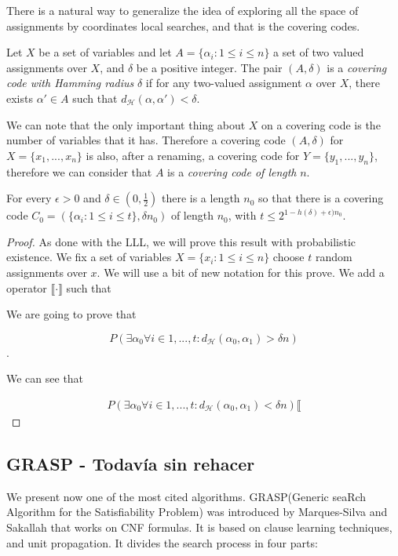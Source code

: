 There is a natural way to generalize the idea of exploring all the space of assignments by coordinates local searches, and that is the covering codes.

\begin{definition}
  Let $X$ be a set of variables and let $A = \{\alpha_i: 1 \le i \le n\}$ a set of two valued assignments over $X$, and $\delta$ be a positive integer. The pair $(A,\delta)$ is a \emph{covering code with Hamming radius} $\delta$ if for any  two-valued assignment  $\alpha$  over $X$, there exists $\alpha'\in A$ such that $d_\mathcal{H} (\alpha, \alpha') < \delta$.
\end{definition}

We can note that the only important thing about $X$ on a covering code is the number of variables that it has. Therefore a covering code $(A,\delta)$ for $X=\{x_1,...,x_n\}$ is also, after a renaming, a covering code for $Y=\{y_1,...,y_n\}$, therefore we can consider that $A$ is a \emph{covering code of length} $n$. 


\begin{lemma}
For every $\epsilon > 0$ and $\delta \in (0, \frac{1}{2})$ there is a length $n_0$ so that there is a covering code $C_0 = (\{\alpha_i : 1\le i\le t\}, \delta n_0)$ of length $n_0$, with $t\le 2^{1-h(\delta)+\epsilon)n_0}$.
\end{lemma}

\begin{proof}
  As done with the LLL, we will prove this result with probabilistic existence. We fix a set of variables $X=\{ x_i : 1 \le i \le n\}$ choose $t$ random assignments over $x$. We will use a bit of new notation for this prove. We add a operator $\llbracket \cdot \rrbracket$ such that

  We are going to prove that

  $$P(\exists \alpha_0 \forall i\in 1,...,t : d_\mathcal{H} (\alpha_0,\alpha_1)  > \delta n)$$.

  We can see that 

\begin{equation}
\begin{split}
  P(\exists \alpha_0 \forall i\in 1,...,t : d_\mathcal{H} (\alpha_0,\alpha_1)  < \delta n)   \llbracket
\end{split}
\end{equation}



\end{proof}

\subsection{GRASP - Todavía sin rehacer }
\label{sub:grasp}
We present now one of the most cited algorithms.  GRASP(Generic seaRch Algorithm for the Satisfiability Problem) was introduced by Marques-Silva and Sakallah\cite{marques1999grasp} that works on CNF formulas. It is based on clause learning techniques, and unit propagation. It divides the search process in four parts:

